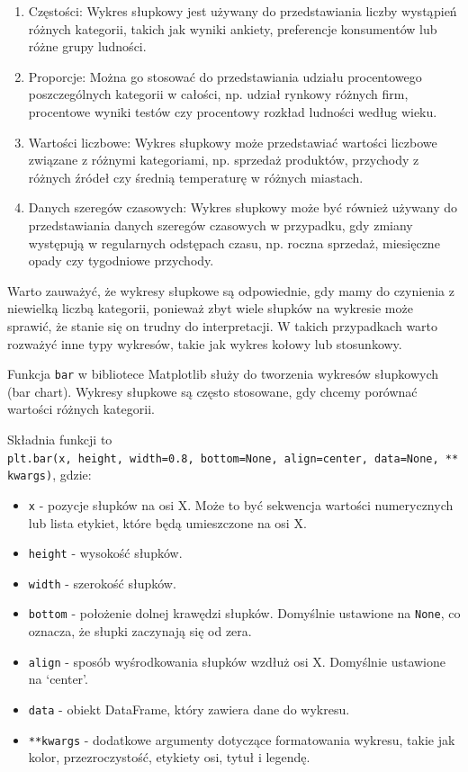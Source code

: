 \documentclass[
  polish,
  letterpaper,
  DIV=11,
  numbers=noendperiod]{scrreprt}
\providecommand{\tightlist}{%
  \setlength{\itemsep}{0pt}\setlength{\parskip}{0pt}}
\begin{document}
\begin{enumerate}
\def\labelenumi{\arabic{enumi}.}
\tightlist
\item
  Częstości: Wykres słupkowy jest używany do przedstawiania liczby
  wystąpień różnych kategorii, takich jak wyniki ankiety, preferencje
  konsumentów lub różne grupy ludności.
\item
  Proporcje: Można go stosować do przedstawiania udziału procentowego
  poszczególnych kategorii w całości, np. udział rynkowy różnych firm,
  procentowe wyniki testów czy procentowy rozkład ludności według wieku.
\item
  Wartości liczbowe: Wykres słupkowy może przedstawiać wartości liczbowe
  związane z różnymi kategoriami, np. sprzedaż produktów, przychody z
  różnych źródeł czy średnią temperaturę w różnych miastach.
\item
  Danych szeregów czasowych: Wykres słupkowy może być również używany do
  przedstawiania danych szeregów czasowych w przypadku, gdy zmiany
  występują w regularnych odstępach czasu, np. roczna sprzedaż,
  miesięczne opady czy tygodniowe przychody.
\end{enumerate}

Warto zauważyć, że wykresy słupkowe są odpowiednie, gdy mamy do
czynienia z niewielką liczbą kategorii, ponieważ zbyt wiele słupków na
wykresie może sprawić, że stanie się on trudny do interpretacji. W
takich przypadkach warto rozważyć inne typy wykresów, takie jak wykres
kołowy lub stosunkowy.

Funkcja \texttt{bar} w bibliotece Matplotlib służy do tworzenia wykresów
słupkowych (bar chart). Wykresy słupkowe są często stosowane, gdy chcemy
porównać wartości różnych kategorii.

Składnia funkcji to
\texttt{plt.bar(x,\ height,\ width=0.8,\ bottom=None,\ align=\textquotesingle{}center\textquotesingle{},\ data=None,\ **kwargs)},
gdzie:

\begin{itemize}
\tightlist
\item
  \texttt{x} - pozycje słupków na osi X. Może to być sekwencja wartości
  numerycznych lub lista etykiet, które będą umieszczone na osi X.
\item
  \texttt{height} - wysokość słupków.
\item
  \texttt{width} - szerokość słupków.
\item
  \texttt{bottom} - położenie dolnej krawędzi słupków. Domyślnie
  ustawione na \texttt{None}, co oznacza, że słupki zaczynają się od
  zera.
\item
  \texttt{align} - sposób wyśrodkowania słupków wzdłuż osi X. Domyślnie
  ustawione na `center'.
\item
  \texttt{data} - obiekt DataFrame, który zawiera dane do wykresu.
\item
  \texttt{**kwargs} - dodatkowe argumenty dotyczące formatowania
  wykresu, takie jak kolor, przezroczystość, etykiety osi, tytuł i
  legendę.
\end{itemize}
\end{document}
